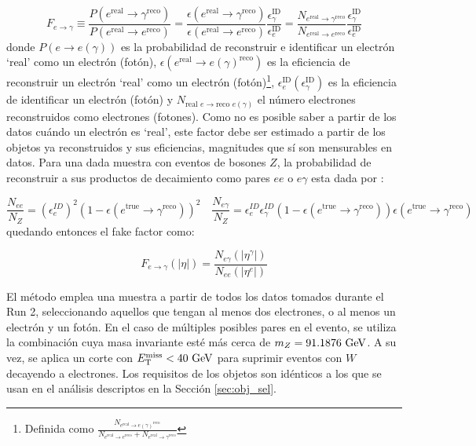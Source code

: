 \begin{equation}
  F_{e\to \gamma} \equiv \frac{P(e^{\text{real}}\to \gamma^{\text{reco}})}{P(e^{\text{real}}\to e^{\text{reco}})}  = \frac{\epsilon(e^{\text{real}}\to \gamma^{\text{reco}})}{\epsilon(e^{\text{real}}\to e^{\text{reco}})} \frac{\epsilon^{\text{ID}}_{\gamma}}{\epsilon^{\text{ID}}_{e}} = \frac{N_{e^{\text{real}}\to \gamma^{\text{reco}}}}{N_{e^{\text{real}}\to e^{\text{reco}}}} \frac{\epsilon^{\text{ID}}_{\gamma}}{\epsilon^{\text{ID}}_{e}}
  \label{eq:efake_ff}
\end{equation} 
%
donde $P(e\to e(\gamma))$ es la probabilidad de reconstruir e identificar un electrón `real' como un electrón (fotón), $\epsilon(e^{\text{real}}\to e(\gamma)^{\text{reco}})$ es la eficiencia de reconstruir un electrón `real' como un electrón (fotón)\footnote{Definida como $\frac{N_{e^{\text{real}}\to e(\gamma)^{\text{reco}}}}{N_{e^{\text{real}}\to e^{\text{reco}}}+N_{e^{\text{real}}\to \gamma^{\text{reco}}}}$}, $\epsilon^{\text{ID}}_{e} (\epsilon^{\text{ID}}_{\gamma})$ es la eficiencia de identificar un electrón (fotón) y $N_{\text{real } e\to \text{reco } e(\gamma)}$ el número electrones reconstruidos como electrones (fotones). Como no es posible saber a partir de los datos cuándo un electrón es `real', este factor debe ser estimado a partir de los objetos ya reconstruidos y sus eficiencias, magnitudes que sí son mensurables en datos. Para una dada muestra con eventos de bosones $Z$, la probabilidad de reconstruir a sus productos de decaimiento como pares $ee$ o $e\gamma$ esta dada por :

\begin{equation}
\frac{N_{ee}}{N_Z} = (\epsilon^{ID}_{e})^{2} (1-\epsilon(e^{\text{true}}\to \gamma^{\text{reco}}))^{2}
\quad
\frac{N_{e\gamma}}{N_Z} = \epsilon^{ID}_{e}\epsilon^{ID}_{\gamma} (1-\epsilon(e^{\text{true}}\to \gamma^{\text{reco}}))\epsilon(e^{\text{true}}\to \gamma^{\text{reco}})
\end{equation}
% 
quedando entonces el fake factor como:

\begin{equation}
  F_{e\to \gamma}(|\eta|) = \frac{N_{e\gamma}(|\eta^{\gamma}|)}{N_{ee}(|\eta^{e}|)}
\end{equation}


El método emplea una muestra a partir de todos los datos tomados durante el Run 2, seleccionando aquellos que tengan al menos dos electrones, o al menos un electrón y un fotón. En el caso de múltiples posibles pares en el evento, se utiliza la combinación cuya masa invariante esté más cerca de $m_Z=91.1876\ \gev$. A su vez, se aplica un corte con $E_{\text{T}}^{\text{miss}}<40\ \text{GeV}$ para suprimir eventos con $W$ decayendo a electrones. Los requisitos de los objetos son idénticos a los que se usan en el análisis descriptos en la Sección \ref{sec:obj_sel}.

